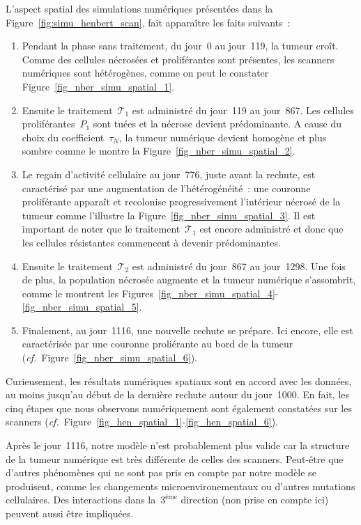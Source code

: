 \documentclass[11pt]{amsart}
\numberwithin{equation}{section}
\newcommand{\TI}{{\mathcal T_1}}
\newcommand{\TS}{{\mathcal T_2}}
\newcommand{\cf}{\textit{cf.}~}
\begin{document}
L'aspect spatial des simulations numériques présentées dans la Figure~\ref{fig:simu_henbert_scan}, fait apparaître les faits suivants~:
\begin{enumerate}[label=\roman*)]
\item \label{ini} Pendant la phase sans traitement, du jour~0
    au jour~119, la tumeur croît. Comme des cellules nécrosées et proliférantes sont présentes, les scanners numériques sont hétérogènes, comme on peut le constater Figure~\ref{fig_nber_simu_spatial_1}.
\item \label{TI} Ensuite le traitement~$\TI$ est administré du jour~119 au jour~867.
 Les cellules proliférantes~$P_1$ sont tuées et la nécrose devient prédominante. A cause du choix du coefficient~$\tau_N$, la tumeur numérique devient homogène et plus sombre comme le montre la Figure~\ref{fig_nber_simu_spatial_2}.
\item \label{failureTI} Le regain d'activité cellulaire au jour~776, juste avant la rechute, est caractérisé par une augmentation de l'hétérogénéité~: une couronne proliférante apparaît et recolonise progressivement l'intérieur nécrosé de la tumeur comme l'illustre la  Figure~\ref{fig_nber_simu_spatial_3}. Il est important de noter que le traitement~$\TI$ est encore administré et donc que les cellules résistantes commencent à devenir prédominantes.
\item \label{TS} Ensuite le traitement~$\TS$ est administré du jour~867 au jour~1298. Une fois de plus, la population nécrosée augmente et la tumeur numérique s'assombrit, comme le montrent les Figures~\ref{fig_nber_simu_spatial_4}-\ref{fig_nber_simu_spatial_5}.
\item \label{last} Finalement, au jour~1116, une nouvelle rechute se prépare. Ici encore, elle est caractérisée par une couronne proliérante au bord de la tumeur (\cf  Figure~\ref{fig_nber_simu_spatial_6}).
\end{enumerate}

Curieusement, les résultats numériques spatiaux sont en accord avec les données, au moins jusqu'au début de la dernière rechute autour du jour~1000. En fait, les cinq étapes que nous observons numériquement sont également constatées sur les scanners (\cf Figure~\ref{fig_hen_spatial_1}-\ref{fig_hen_spatial_6}).


Après le jour~1116, notre modèle n'est probablement plus valide car la structure de la tumeur numérique est très différente de celles des scanners. Peut-être que d'autres phénomènes qui ne sont pas pris en compte par notre modèle se produisent, comme les changements microenvironementaux ou d'autres mutations cellulaires. Des interactions dans la~$3^\textrm{ème}$ direction (non prise en compte ici) peuvent aussi être impliquées.
\end{document}
